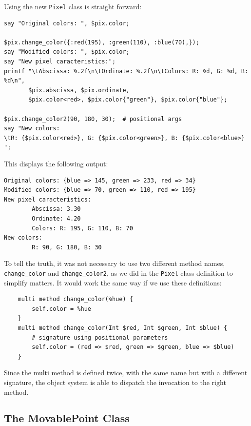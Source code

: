 Using the new {\tt Pixel} class is straight forward:

\begin{verbatim}
say "Original colors: ", $pix.color;

$pix.change_color({:red(195), :green(110), :blue(70),});
say "Modified colors: ", $pix.color;
say "New pixel caracteristics:";
printf "\tAbscissa: %.2f\n\tOrdinate: %.2f\n\tColors: R: %d, G: %d, B: %d\n",
       $pix.abscissa, $pix.ordinate, 
       $pix.color<red>, $pix.color{"green"}, $pix.color{"blue"};

$pix.change_color2(90, 180, 30);  # positional args
say "New colors:  
\tR: {$pix.color<red>}, G: {$pix.color<green>}, B: {$pix.color<blue>} ";
\end{verbatim}

This displays the following output:

\begin{verbatim}
Original colors: {blue => 145, green => 233, red => 34}
Modified colors: {blue => 70, green => 110, red => 195}
New pixel caracteristics:
        Abscissa: 3.30
        Ordinate: 4.20
        Colors: R: 195, G: 110, B: 70
New colors:  
        R: 90, G: 180, B: 30
\end{verbatim}

To tell the truth, it was not necessary to use two different 
method names, \verb'change_color' and \verb'change_color2', as 
we did in the {\tt Pixel} class definition to simplify matters. 
It would work the same way if we use these definitions:

\begin{verbatim}
    multi method change_color(%hue) {
        self.color = %hue
    }
    multi method change_color(Int $red, Int $green, Int $blue) {
        # signature using positional parameters
        self.color = (red => $red, green => $green, blue => $blue)
    }
\end{verbatim} 

Since the multi method is defined twice, with the same name but 
with a different signature, the object system is able to 
dispatch the invocation to the right method.


\subsection{The MovablePoint Class}

